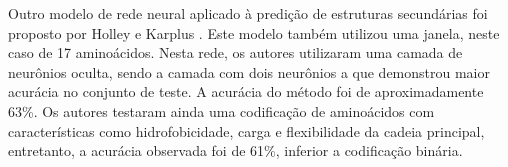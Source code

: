 Outro modelo de rede neural aplicado à predição de estruturas secundárias foi proposto por Holley e Karplus \citeyear{key}. Este modelo também utilizou uma janela, neste caso de 17 aminoácidos. Nesta rede, os autores utilizaram uma camada de neurônios oculta, sendo a camada com dois neurônios a que demonstrou maior acurácia no conjunto de teste. A acurácia do método foi de aproximadamente 63\%. Os autores testaram ainda uma codificação de aminoácidos com características como hidrofobicidade, carga e flexibilidade da cadeia principal, entretanto, a acurácia observada foi de 61\%, inferior a codificação binária.






